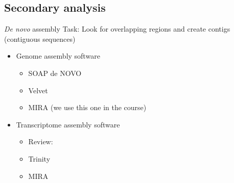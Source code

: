\documentclass[presentation]{beamer}
\begin{document}
\subsection{Secondary analysis}
\label{sec-3-1}
\begin{frame}[label=sec-3-1-1]{\emph{De novo} assembly}
Task: Look for overlapping regions and create contigs (contiguous sequences)
\begin{itemize}
\item Genome assembly software
\begin{itemize}
\item SOAP de NOVO
\item Velvet
\item MIRA (we use this one in the course)
\end{itemize}
\end{itemize}

\begin{itemize}
\item Transcriptome assembly software
\begin{itemize}
\item Review: \citet{Martin2011}
\item Trinity
\item MIRA
\end{itemize}
\end{itemize}
\end{frame}
\end{document}
